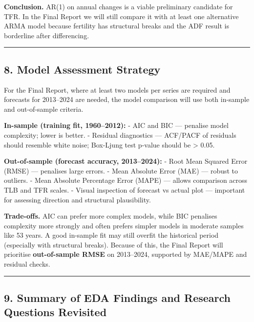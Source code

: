 \documentclass[
]{article}
\begin{document}
\textbf{Conclusion.} AR(1) on annual changes is a viable preliminary
candidate for TFR. In the Final Report we will still compare it with at
least one alternative ARMA model because fertility has structural breaks
and the ADF result is borderline after differencing.

\begin{center}\rule{0.5\linewidth}{0.5pt}\end{center}

\subsection{8. Model Assessment
Strategy}\label{model-assessment-strategy}

For the Final Report, where at least two models per series are required
and forecasts for 2013--2024 are needed, the model comparison will use
both in-sample and out-of-sample criteria.

\textbf{In-sample (training fit, 1960--2012):} - AIC and BIC ---
penalise model complexity; lower is better. - Residual diagnostics ---
ACF/PACF of residuals should resemble white noise; Box-Ljung test
p-value should be \textgreater{} 0.05.

\textbf{Out-of-sample (forecast accuracy, 2013--2024):} - Root Mean
Squared Error (RMSE) --- penalises large errors. - Mean Absolute Error
(MAE) --- robust to outliers. - Mean Absolute Percentage Error (MAPE)
--- allows comparison across TLB and TFR scales. - Visual inspection of
forecast vs actual plot --- important for assessing direction and
structural plausibility.

\textbf{Trade-offs.} AIC can prefer more complex models, while BIC
penalises complexity more strongly and often prefers simpler models in
moderate samples like 53 years. A good in-sample fit may still overfit
the historical period (especially with structural breaks). Because of
this, the Final Report will prioritise \textbf{out-of-sample RMSE} on
2013--2024, supported by MAE/MAPE and residual checks.

\begin{center}\rule{0.5\linewidth}{0.5pt}\end{center}

\subsection{9. Summary of EDA Findings and Research Questions
Revisited}\label{summary-of-eda-findings-and-research-questions-revisited}
\end{document}
